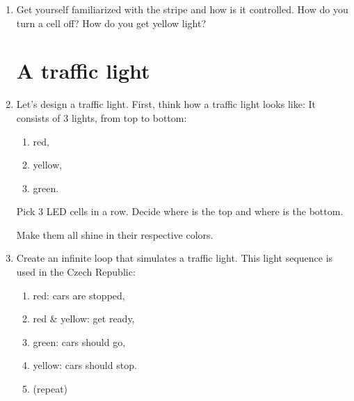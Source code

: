 \documentclass{../tutorial}
\begin{document}
\begin{enumerate}
    \newcommand\rgb[3]{\texttt{%
        \textcolor{red}{#1},
        \textcolor{black!50!green}{#2},
        \textcolor{blue}{#3}}
    }
    \begin{lstlisting}[escapeinside=<>]
    np[0] = <\rgb{0}{5}{10}>   # green + blue = cyan
    np[1] = <\rgb{7}{1}{10}>   # red + blue = purple
    ...
    np[7] = <\rgb{10}{10}{10}> # white
    np.write()
    \end{lstlisting}

\item
    Get yourself familiarized with the stripe and how is it controlled.
    How do you turn a cell off?
    How do you get yellow light?

\section{A traffic light}

\item
    Let's design a traffic light.
    First, think how a traffic light looks like:
    It consists of 3 lights, from top to bottom:

    \begin{enumerate}
    \item red,
    \item yellow,
    \item green.
    \end{enumerate}

    Pick 3 LED cells in a row.
    Decide where is the top and where is the bottom.

    Make them all shine in their respective colors.

\item
    Create an infinite loop that simulates a traffic light.
    This light sequence is used in the Czech Republic:

    \begin{enumerate}
    \item red: cars are stopped,
    \item red \& yellow: get ready,
    \item green: cars should go,
    \item yellow: cars should stop.
    \item (repeat)
    \end{enumerate}


\end{enumerate}
\end{document}
